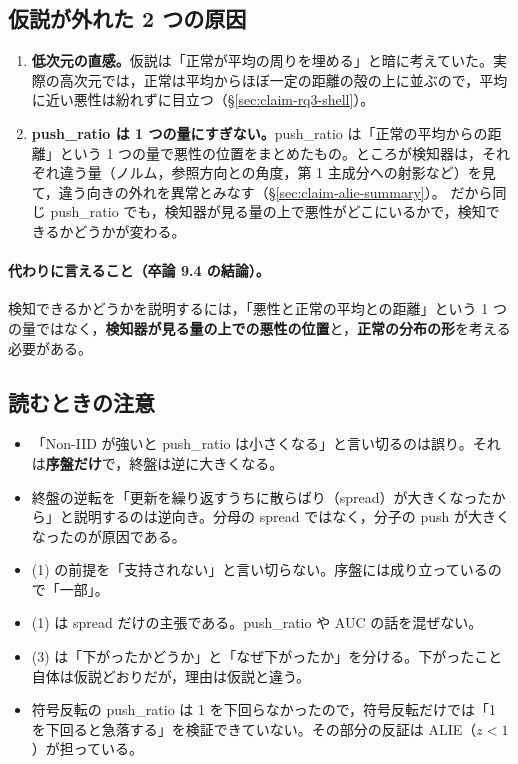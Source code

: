 \documentclass[a4j, dvipdfmx]{jsarticle}  %
\begin{document}
\subsection{仮説が外れた 2 つの原因}
\label{sec:claim-hyp4-why}

\begin{enumerate}
  \item \textbf{低次元の直感。}仮説は「正常が平均の周りを埋める」と暗に考えていた。実際の高次元では，正常は平均からほぼ一定の距離の殻の上に並ぶので，平均に近い悪性は紛れずに目立つ（\S\ref{sec:claim-rq3-shell}）。
  \item \textbf{push\_ratio は 1 つの量にすぎない。}push\_ratio は「正常の平均からの距離」という 1 つの量で悪性の位置をまとめたもの。ところが検知器は，それぞれ違う量（ノルム，参照方向との角度，第 1 主成分への射影など）を見て，違う向きの外れを異常とみなす（\S\ref{sec:claim-alie-summary}）。
        だから同じ push\_ratio でも，検知器が見る量の上で悪性がどこにいるかで，検知できるかどうかが変わる。
\end{enumerate}

\paragraph{代わりに言えること（卒論 9.4 の結論）。}
検知できるかどうかを説明するには，「悪性と正常の平均との距離」という 1 つの量ではなく，\textbf{検知器が見る量の上での悪性の位置}と，\textbf{正常の分布の形}を考える必要がある。

\subsection{読むときの注意}

\begin{itemize}
  \item 「Non-IID が強いと push\_ratio は小さくなる」と言い切るのは誤り。それは\textbf{序盤だけ}で，終盤は逆に大きくなる。
  \item 終盤の逆転を「更新を繰り返すうちに散らばり（spread）が大きくなったから」と説明するのは逆向き。分母の spread ではなく，分子の push が大きくなったのが原因である。
  \item (1) の前提を「支持されない」と言い切らない。序盤には成り立っているので「一部」。
  \item (1) は spread だけの主張である。push\_ratio や AUC の話を混ぜない。
  \item (3) は「下がったかどうか」と「なぜ下がったか」を分ける。下がったこと自体は仮説どおりだが，理由は仮説と違う。
  \item 符号反転の push\_ratio は 1 を下回らなかったので，符号反転だけでは「1 を下回ると急落する」を検証できていない。その部分の反証は ALIE（$z < 1$）が担っている。
\end{itemize}
\end{document}
